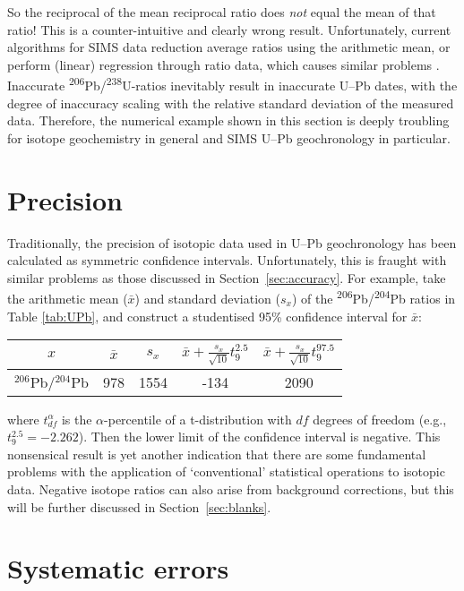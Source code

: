 \documentclass{article}
\begin{document}
So the reciprocal of the mean reciprocal ratio does {\it not} equal
the mean of that ratio! This is a counter-intuitive and clearly wrong
result. Unfortunately, current algorithms for SIMS data reduction
average ratios using the arithmetic mean, or perform (linear)
regression through ratio data, which causes similar problems
\citep{ogliore2011}. Inaccurate
\textsuperscript{206}Pb/\textsuperscript{238}U-ratios inevitably
result in inaccurate U--Pb dates, with the degree of inaccuracy
scaling with the relative standard deviation of the measured
data. Therefore, the numerical example shown in this section is deeply
troubling for isotope geochemistry in general and SIMS U--Pb
geochronology in particular.

\section{Precision}\label{sec:precision}

Traditionally, the precision of isotopic data used in U--Pb
geochronology has been calculated as symmetric confidence
intervals. Unfortunately, this is fraught with similar problems as
those discussed in Section~\ref{sec:accuracy}.  For example, take the
arithmetic mean ($\bar{x}$) and standard deviation ($s_x$) of the
\textsuperscript{206}Pb/\textsuperscript{204}Pb ratios in Table
\ref{tab:UPb}, and construct a studentised 95\% confidence interval
for $\bar{x}$:
\begin{center}
\begin{tabular}{ccccc}
  $x$ & $\bar{x}$ & $s_x$ &
  $\bar{x}+\frac{s_x}{\sqrt{10}}t^{2.5}_{9}$ &
  $\bar{x}+\frac{s_x}{\sqrt{10}}t^{97.5}_{9}$ \\ \hline
  $^{206}$Pb/$^{204}$Pb & 978 & 1554 & -134 & 2090 \\
\end{tabular}
\end{center}

\noindent where $t^{\alpha}_{df}$ is the $\alpha$-percentile of a
t-distribution with $df$ degrees of freedom (e.g.,
$t^{2.5}_{9}=-2.262$). Then the lower limit of the confidence interval
is negative. This nonsensical result is yet another indication that
there are some fundamental problems with the application of
`conventional' statistical operations to isotopic data. Negative
isotope ratios can also arise from background corrections, but this
will be further discussed in Section~\ref{sec:blanks}.

\section{Systematic errors}\label{sec:syserr}
\end{document}
